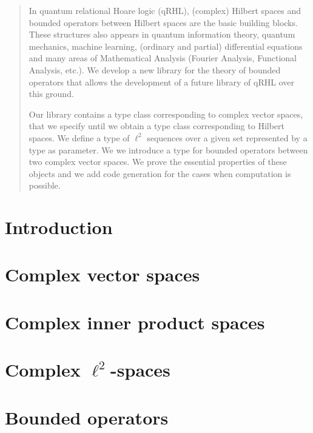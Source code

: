 \documentclass[12pt]{article}
\theoremstyle{definition}
\begin{document}
\maketitle

\begin{abstract}
In quantum relational Hoare logic (qRHL), (complex) Hilbert spaces and bounded operators between Hilbert spaces are the basic building blocks. These structures also appears in quantum information theory, quantum mechanics, machine learning, (ordinary and partial) differential equations and many areas of Mathematical Analysis (Fourier Analysis, Functional Analysis, etc.). We develop a new library for the theory of bounded operators that allows the development of a future library of qRHL over this ground.

Our library contains a type class corresponding to complex vector spaces, that we specify until we obtain a type class corresponding to Hilbert spaces. We define a type of $\ell^2$ sequences over a given set represented by a type as parameter. We we introduce a type for bounded operators between two complex vector spaces. We prove the essential properties of these objects and we add code generation for the cases when computation is possible.
\end{abstract}

\section{Introduction}
\cite{unruh2019quantum}

\blindtext[4]

\section{Complex vector spaces}
\blindtext[6]

\section{Complex inner product spaces}
\blindtext[6]

\section{Complex $\ell^2$-spaces}
\blindtext[6]

\section{Bounded operators}
\blindtext[6]
\end{document}
